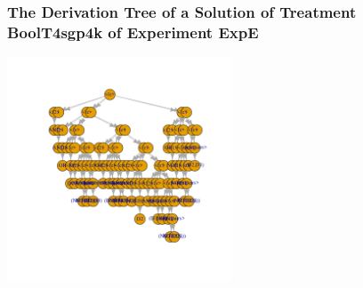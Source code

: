 \begin{frame}
 \frametitle{ The Derivation Tree of a Solution of Treatment BoolT4sgp4k of Experiment ExpE }
 \begin{center}
\includegraphics[width=0.5\textwidth, angle=0]
{ExpEDerivationTreeFigure002.pdf}
 \end{center}
 \label{report/ExpEDerivationTreeFigure002.pdf}  
 \end{frame}

